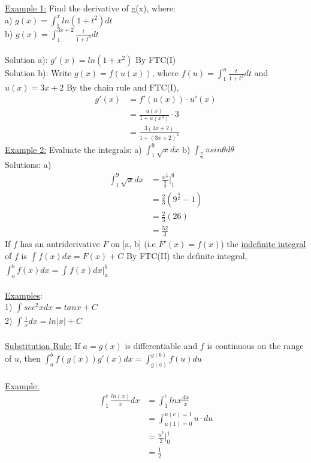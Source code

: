 \documentclass[12pt]{letter}
\begin{document}
\underline{Example 1:}  
Find the derivative of g(x), where: \\ a) $g(x) = \int_{1}^{x} ln(1+t^{2})dt$ \\ b)  $g(x) = \int_{1}^{3x+2}\frac{t}{1+t^{3}}dt$ \\ \\
Solution a): $g'(x) = ln(1+x^{2})$ By FTC(I) \\
Solution b): Write $g(x) = f(u(x))$, where $f(u) = \int_{1}^{u}\frac{t}{1+t^{3}}dt$ and $u(x) = 3x + 2$
By the chain rule and FTC(I), \\ \begin{equation} \begin{split} g'(x) &= f'(u(x)) \cdot u'(x) \\
&= \frac{u(x)}{1+u(x^{3})} \cdot 3 \\ &=\frac{3(3x + 2)}{1+(3x+2)^{3}} \end{split} \end{equation} \newpage
\underline{Example 2:} Evaluate the integrals: a) $\int_{1}^{9}\sqrt{x}dx$ b) $\int_{\frac{\pi}{6}}{\pi}sin\theta d\theta$ \\ Solutions: a) \begin{equation} \begin{split} \int_{1}^{9}\sqrt{x} dx &=\frac{x^{\frac{3}{2}}}{\frac {3}{2}} \Big |_1^9 \\ &=\frac{2}{3}(9^{\frac{3}{2}}-1) \\ &= \frac{2}{3}(26) \\ &=\frac{52}{3} \end{split} \end{equation} 
If $f$ has an antriderivative $F$ on [a, b] (i.e $F'(x) = f(x)$) the \underline{indefinite integral} of $f$ is $\int_{}f(x)dx = F(x) + C$ By FTC(II) the definite integral, 
\\ $\int_{a}^{b}f(x)dx = \int_{}f(x)dx\Big |_a^b$ \\ \\
\underline{Examples}: \\ 1) $\int_{}sec^{2}xdx = tanx + C$ \\ 2) $\int_{}\frac{1}{x}dx=ln|x|+C$ \\ \\
\underline{Substitution Rule:} If $a=g(x)$ is differentiable and $f$ is continuous on the range of $u$, then $\int_{a}^{b}f(g(x))g'(x)dx = \int_{g(a)}^{g(b)}f(u)du$ \\ \\
\underline{Example:} \begin{equation} \begin{split} \int_{1}^{e}\frac{ln(x)}{x}dx &=\int_{1}^{e}lnx\frac{dx}{x} \\ &=\int_{u(1)=0}^{u(e)=1}u\cdot du \\ &=\frac{u^{2}}{2} \Big|_0^1 \\ &=\frac{1}{2} \end{split} \end{equation} 
\end{document}
